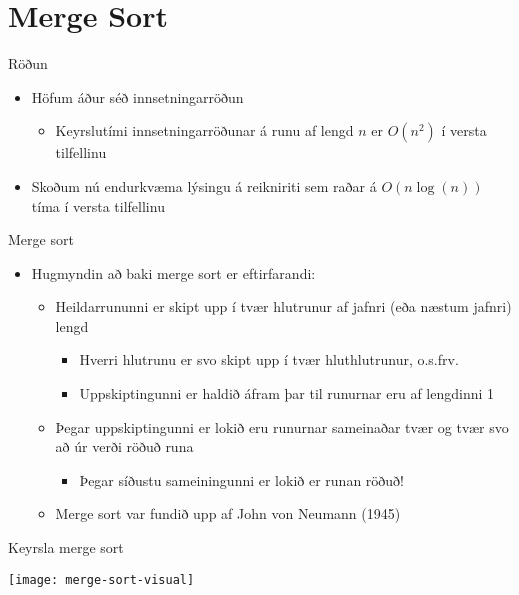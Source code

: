 \documentclass[handout]{beamer}
\begin{document}
\section{Merge Sort}

\begin{frame}{Röðun}
\begin{itemize}
 \item Höfum áður séð innsetningarröðun
 \begin{itemize}
  \item Keyrslutími innsetningarröðunar á runu af lengd $n$ er $O(n^2)$ í versta tilfellinu
 \end{itemize}
 \item Skoðum nú endurkvæma lýsingu á reikniriti sem raðar á $O(n\log(n))$ tíma í versta tilfellinu
\end{itemize}
\end{frame}

\begin{frame}{Merge sort}
\begin{itemize}
 \item Hugmyndin að baki merge sort er eftirfarandi:
 \begin{itemize}
  \item Heildarrununni er skipt upp í tvær hlutrunur af jafnri (eða næstum jafnri) lengd
  \begin{itemize}
   \item Hverri hlutrunu er svo skipt upp í tvær hluthlutrunur, o.s.frv.
   \item Uppskiptingunni er haldið áfram þar til runurnar eru af lengdinni 1
  \end{itemize}
  \item Þegar uppskiptingunni er lokið eru runurnar sameinaðar tvær og tvær svo að úr verði röðuð runa
  \begin{itemize}
   \item Þegar síðustu sameiningunni er lokið er runan röðuð!
  \end{itemize}
  \item Merge sort var fundið upp af John von Neumann (1945)
 \end{itemize}
\end{itemize}
\end{frame}

\begin{frame}{Keyrsla merge sort}
\vspace{0.5cm}
\begin{center}
\texttt{[image: merge-sort-visual]}
\end{center}
\end{frame}
\end{document}
